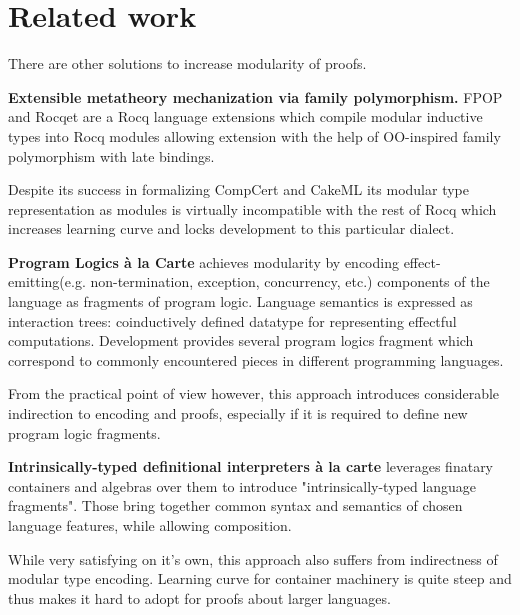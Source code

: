 \documentclass[sigplan,nonacm]{acmart}
\begin{document}
\section{Related work}

There are other solutions to increase modularity of proofs. 

\medskip

\textbf{Extensible metatheory mechanization via family polymorphism. } FPOP\cite{jin2023extensible} and Rocqet\cite{ebresafe2025certified} are a Rocq language extensions which compile modular inductive types into Rocq modules allowing extension with the help of 
OO-inspired family polymorphism with late bindings. 

Despite its success in formalizing CompCert and CakeML its modular type representation as modules is virtually incompatible with the rest of Rocq which increases learning curve and locks development to this particular dialect. 

\medskip
\textbf{Program Logics à la Carte}\cite{vistrup2025program} achieves modularity by encoding effect-emitting(e.g. non-termination, exception, concurrency, etc.) components of the language as fragments of program logic. 
Language semantics is expressed as interaction trees\cite{xia2019interaction}: coinductively defined datatype for representing effectful computations. 
Development provides several program logics fragment which correspond to commonly encountered pieces in different programming languages. 

From the practical point of view however, this approach introduces considerable indirection to encoding and proofs, especially if it is required to define new program logic fragments.



\medskip
\textbf{Intrinsically-typed definitional interpreters {\`a} la carte}\cite{van2022intrinsically} leverages finatary containers\cite{altenkirch2015indexed} and algebras over them to introduce "intrinsically-typed language fragments".
Those bring together common syntax and semantics of chosen language features, while allowing composition. 

While very satisfying on it's own, this approach also suffers from indirectness of modular type encoding. Learning curve for container machinery is quite steep and thus makes it hard to adopt for proofs about larger languages.
\end{document}
